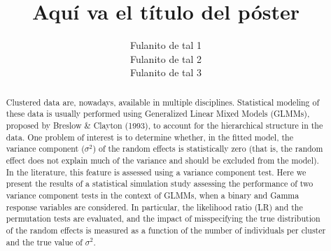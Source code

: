 \documentclass{sciposter}
\title{\textcolor{titlecolor}{Aquí va el título del póster}}
\author{Fulanito de tal 1\\
	Fulanito de tal 2\\
	Fulanito de tal 3}
\institute{Universidad Nacional de Colombia\\
			Universidad Pontificia Bolivariana\\
			Universidad del Norte}
\begin{document}
\begin{boldmath}

\maketitle

\begin{multicols}{3}

\begin{abstract}
Clustered data are, nowadays, available in multiple disciplines. Statistical modeling of these data is usually performed using Generalized Linear Mixed Models (GLMMs), proposed by Breslow \& Clayton (1993), to account for the  hierarchical structure in the data. One problem of interest is to determine whether, in the fitted model, the variance component ($\sigma^2$) of the random effects is statistically zero (that is, the random effect does not explain much of the variance and should be excluded from the model). In the literature, this feature is assessed using a variance component test. Here we present the results of a statistical simulation study assessing the performance of two variance component tests in the context of GLMMs, when a binary and Gamma response variables are considered. In particular, the likelihood ratio (LR) and the permutation tests are evaluated, and the impact of misspecifying the true distribution of the random effects is measured as a function of the number of individuals per cluster and the true value of $\sigma^2$.
\end{abstract}

\end{multicols}
\end{boldmath}
\end{document}
